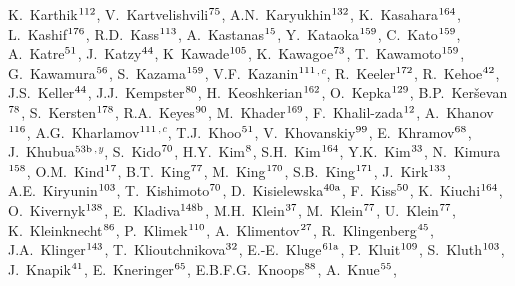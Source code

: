 \begin{flushleft}
K.~Karthik$^\textrm{\scriptsize 112}$,
V.~Kartvelishvili$^\textrm{\scriptsize 75}$,
A.N.~Karyukhin$^\textrm{\scriptsize 132}$,
K.~Kasahara$^\textrm{\scriptsize 164}$,
L.~Kashif$^\textrm{\scriptsize 176}$,
R.D.~Kass$^\textrm{\scriptsize 113}$,
A.~Kastanas$^\textrm{\scriptsize 15}$,
Y.~Kataoka$^\textrm{\scriptsize 159}$,
C.~Kato$^\textrm{\scriptsize 159}$,
A.~Katre$^\textrm{\scriptsize 51}$,
J.~Katzy$^\textrm{\scriptsize 44}$,
K~Kawade$^\textrm{\scriptsize 105}$,
K.~Kawagoe$^\textrm{\scriptsize 73}$,
T.~Kawamoto$^\textrm{\scriptsize 159}$,
G.~Kawamura$^\textrm{\scriptsize 56}$,
S.~Kazama$^\textrm{\scriptsize 159}$,
V.F.~Kazanin$^\textrm{\scriptsize 111}$$^{,c}$,
R.~Keeler$^\textrm{\scriptsize 172}$,
R.~Kehoe$^\textrm{\scriptsize 42}$,
J.S.~Keller$^\textrm{\scriptsize 44}$,
J.J.~Kempster$^\textrm{\scriptsize 80}$,
H.~Keoshkerian$^\textrm{\scriptsize 162}$,
O.~Kepka$^\textrm{\scriptsize 129}$,
B.P.~Ker\v{s}evan$^\textrm{\scriptsize 78}$,
S.~Kersten$^\textrm{\scriptsize 178}$,
R.A.~Keyes$^\textrm{\scriptsize 90}$,
M.~Khader$^\textrm{\scriptsize 169}$,
F.~Khalil-zada$^\textrm{\scriptsize 12}$,
A.~Khanov$^\textrm{\scriptsize 116}$,
A.G.~Kharlamov$^\textrm{\scriptsize 111}$$^{,c}$,
T.J.~Khoo$^\textrm{\scriptsize 51}$,
V.~Khovanskiy$^\textrm{\scriptsize 99}$,
E.~Khramov$^\textrm{\scriptsize 68}$,
J.~Khubua$^\textrm{\scriptsize 53b}$$^{,y}$,
S.~Kido$^\textrm{\scriptsize 70}$,
H.Y.~Kim$^\textrm{\scriptsize 8}$,
S.H.~Kim$^\textrm{\scriptsize 164}$,
Y.K.~Kim$^\textrm{\scriptsize 33}$,
N.~Kimura$^\textrm{\scriptsize 158}$,
O.M.~Kind$^\textrm{\scriptsize 17}$,
B.T.~King$^\textrm{\scriptsize 77}$,
M.~King$^\textrm{\scriptsize 170}$,
S.B.~King$^\textrm{\scriptsize 171}$,
J.~Kirk$^\textrm{\scriptsize 133}$,
A.E.~Kiryunin$^\textrm{\scriptsize 103}$,
T.~Kishimoto$^\textrm{\scriptsize 70}$,
D.~Kisielewska$^\textrm{\scriptsize 40a}$,
F.~Kiss$^\textrm{\scriptsize 50}$,
K.~Kiuchi$^\textrm{\scriptsize 164}$,
O.~Kivernyk$^\textrm{\scriptsize 138}$,
E.~Kladiva$^\textrm{\scriptsize 148b}$,
M.H.~Klein$^\textrm{\scriptsize 37}$,
M.~Klein$^\textrm{\scriptsize 77}$,
U.~Klein$^\textrm{\scriptsize 77}$,
K.~Kleinknecht$^\textrm{\scriptsize 86}$,
P.~Klimek$^\textrm{\scriptsize 110}$,
A.~Klimentov$^\textrm{\scriptsize 27}$,
R.~Klingenberg$^\textrm{\scriptsize 45}$,
J.A.~Klinger$^\textrm{\scriptsize 143}$,
T.~Klioutchnikova$^\textrm{\scriptsize 32}$,
E.-E.~Kluge$^\textrm{\scriptsize 61a}$,
P.~Kluit$^\textrm{\scriptsize 109}$,
S.~Kluth$^\textrm{\scriptsize 103}$,
J.~Knapik$^\textrm{\scriptsize 41}$,
E.~Kneringer$^\textrm{\scriptsize 65}$,
E.B.F.G.~Knoops$^\textrm{\scriptsize 88}$,
A.~Knue$^\textrm{\scriptsize 55}$,
$$
\end{flushleft}
